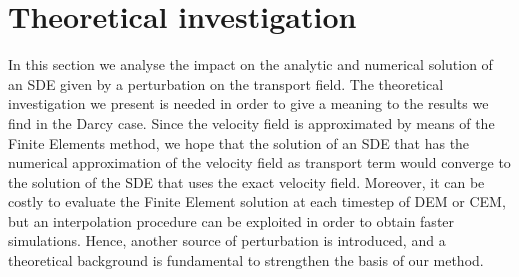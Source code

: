 \section{Theoretical investigation}
In this section we analyse the impact on the analytic and numerical solution of an SDE given by a perturbation on the transport field. The theoretical investigation we present is needed in order to give a meaning to the results we find in the Darcy case. Since the velocity field is approximated by means of the Finite Elements method, we hope that the solution of an SDE that has the numerical approximation of the velocity field as transport term would converge to the solution of the SDE that uses the exact velocity field. Moreover, it can be costly to evaluate the Finite Element solution at each timestep of DEM or CEM, but an interpolation procedure can be exploited in order to obtain faster simulations. Hence, another source of perturbation is introduced, and a theoretical background is fundamental to strengthen the basis of our method.

